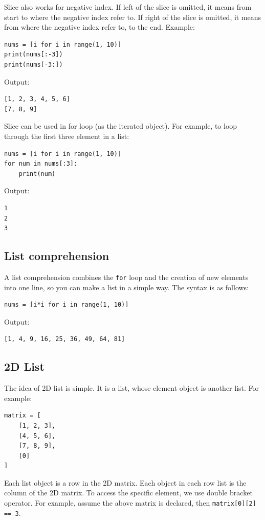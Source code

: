 \documentclass[12pt]{book}
\begin{document}
Slice also works for negative index. If left of the slice is omitted, it means from start to where the negative index refer to. If right of the slice is omitted, it means from where the negative index refer to, to the end. Example:
\begin{verbatim}
nums = [i for i in range(1, 10)]
print(nums[:-3])
print(nums[-3:])
\end{verbatim}
Output:
\begin{verbatim}
[1, 2, 3, 4, 5, 6]
[7, 8, 9]
\end{verbatim}

Slice can be used in for loop (as the iterated object). For example, to loop through the first three element in a list:
\begin{verbatim}
nums = [i for i in range(1, 10)]
for num in nums[:3]:
    print(num)
\end{verbatim}
Output:
\begin{verbatim}
1
2
3
\end{verbatim}

\subsection{List comprehension}
\label{sec:org4e186b1}
A list comprehension combines the \texttt{for} loop and the creation of new elements into one line, so you can make a list in a simple way. The syntax is as follows:
\begin{verbatim}
nums = [i*i for i in range(1, 10)]
\end{verbatim}
Output:
\begin{verbatim}
[1, 4, 9, 16, 25, 36, 49, 64, 81]
\end{verbatim}

\subsection{2D List}
\label{sec:org759bc46}
The idea of 2D list is simple. It is a list, whose element object is another list. For example:
\begin{verbatim}
matrix = [
    [1, 2, 3],
    [4, 5, 6],
    [7, 8, 9],
    [0]
]
\end{verbatim}

Each list object is a row in the 2D matrix. Each object in each row list is the column of the 2D matrix. To access the specific element, we use double bracket operator. For example, assume the above matrix is declared, then \texttt{matrix[0][2] == 3}.
\end{document}
